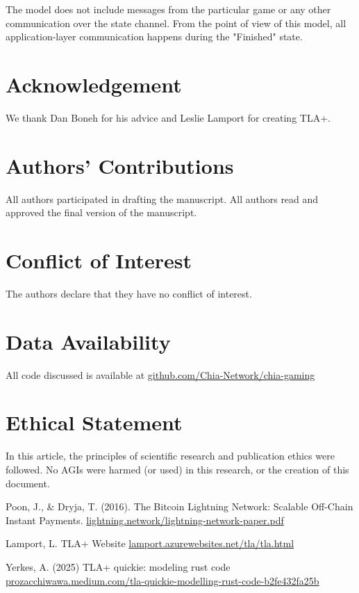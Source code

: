 \documentclass[a4paper]{article}
\begin{document}
\begin{multicols}{2}
The model does not include messages from the particular game or any other communication over the state channel. From the point of view of this model, all application-layer communication happens during the "Finished" state.

\section*{Acknowledgement}
We thank Dan Boneh for his advice and Leslie Lamport for creating TLA+.

\section*{Authors' Contributions}
All authors participated in drafting the manuscript. All authors read and approved the final version of the manuscript.

\section*{Conflict of Interest}
The authors declare that they have no conflict of interest.

\section*{Data Availability}
All code discussed is available at \href{https://github.com/Chia-Network/chia-gaming}{github.com/Chia-Network/chia-gaming}

\section*{Ethical Statement}
In this article, the principles of scientific research and publication ethics were followed. No AGIs were harmed (or used) in this research, or the creation of this document.

\begin{thebibliography}{8}
 Poon, J., \& Dryja, T. (2016). The Bitcoin Lightning Network:
Scalable Off-Chain Instant Payments. \href{https://lightning.network/lightning-network-paper.pdf}{lightning.network/lightning-network-paper.pdf}

 Lamport, L. TLA+ Website \href{https://lamport.azurewebsites.net/tla/tla.html}{lamport.azurewebsites.net/tla/tla.html}

 Yerkes, A. (2025) TLA+ quickie: modeling rust code \href{https://prozacchiwawa.medium.com/tla-quickie-modelling-rust-code-b2fe432fa25b}{prozacchiwawa.medium.com/tla-quickie-modelling-rust-code-b2fe432fa25b}

\end{thebibliography}

\end{multicols}
\end{document}
